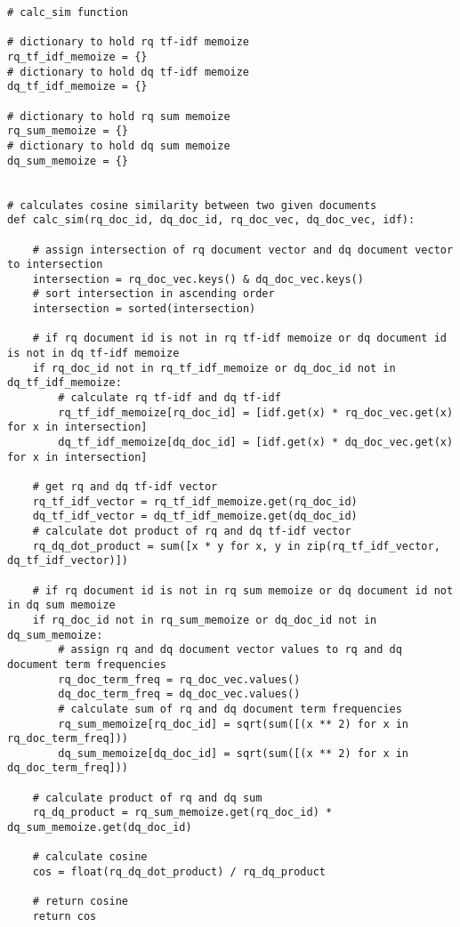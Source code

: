 \documentclass{article} %
\begin{document}
\begin{lstlisting}[style=Python]
# calc_sim function

# dictionary to hold rq tf-idf memoize
rq_tf_idf_memoize = {}
# dictionary to hold dq tf-idf memoize
dq_tf_idf_memoize = {}

# dictionary to hold rq sum memoize
rq_sum_memoize = {}
# dictionary to hold dq sum memoize
dq_sum_memoize = {}


# calculates cosine similarity between two given documents
def calc_sim(rq_doc_id, dq_doc_id, rq_doc_vec, dq_doc_vec, idf):

    # assign intersection of rq document vector and dq document vector to intersection
    intersection = rq_doc_vec.keys() & dq_doc_vec.keys()
    # sort intersection in ascending order
    intersection = sorted(intersection)

    # if rq document id is not in rq tf-idf memoize or dq document id is not in dq tf-idf memoize
    if rq_doc_id not in rq_tf_idf_memoize or dq_doc_id not in dq_tf_idf_memoize:
        # calculate rq tf-idf and dq tf-idf
        rq_tf_idf_memoize[rq_doc_id] = [idf.get(x) * rq_doc_vec.get(x) for x in intersection]
        dq_tf_idf_memoize[dq_doc_id] = [idf.get(x) * dq_doc_vec.get(x) for x in intersection]

    # get rq and dq tf-idf vector
    rq_tf_idf_vector = rq_tf_idf_memoize.get(rq_doc_id)
    dq_tf_idf_vector = dq_tf_idf_memoize.get(dq_doc_id)
    # calculate dot product of rq and dq tf-idf vector
    rq_dq_dot_product = sum([x * y for x, y in zip(rq_tf_idf_vector, dq_tf_idf_vector)])

    # if rq document id is not in rq sum memoize or dq document id not in dq sum memoize
    if rq_doc_id not in rq_sum_memoize or dq_doc_id not in dq_sum_memoize:
        # assign rq and dq document vector values to rq and dq document term frequencies
        rq_doc_term_freq = rq_doc_vec.values()
        dq_doc_term_freq = dq_doc_vec.values()
        # calculate sum of rq and dq document term frequencies
        rq_sum_memoize[rq_doc_id] = sqrt(sum([(x ** 2) for x in rq_doc_term_freq]))
        dq_sum_memoize[dq_doc_id] = sqrt(sum([(x ** 2) for x in dq_doc_term_freq]))

    # calculate product of rq and dq sum
    rq_dq_product = rq_sum_memoize.get(rq_doc_id) * dq_sum_memoize.get(dq_doc_id)

    # calculate cosine
    cos = float(rq_dq_dot_product) / rq_dq_product

    # return cosine
    return cos
\end{lstlisting}
\end{document}
